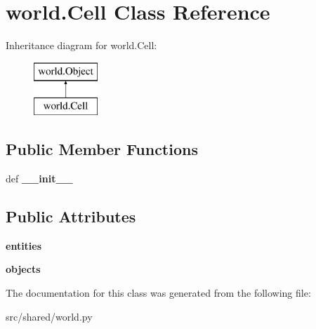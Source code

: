 \hypertarget{classworld_1_1_cell}{\section{world.\-Cell \-Class \-Reference}
\label{classworld_1_1_cell}
}
\-Inheritance diagram for world.\-Cell\-:\begin{figure}[H]
\begin{center}
\leavevmode
\includegraphics[height=2.000000cm]{classworld_1_1_cell}
\end{center}
\end{figure}
\subsection*{\-Public \-Member \-Functions}
\begin{DoxyCompactItemize}
\item 
\hypertarget{classworld_1_1_cell_a3dd387b6af13f7450acb97fb40c13a0e}{def {\bfseries \-\_\-\-\_\-init\-\_\-\-\_\-}}\label{classworld_1_1_cell_a3dd387b6af13f7450acb97fb40c13a0e}

\end{DoxyCompactItemize}
\subsection*{\-Public \-Attributes}
\begin{DoxyCompactItemize}
\item 
\hypertarget{classworld_1_1_cell_abacc61990c80c148f496f72be2f43dc6}{{\bfseries entities}}\label{classworld_1_1_cell_abacc61990c80c148f496f72be2f43dc6}

\item 
\hypertarget{classworld_1_1_cell_afd921144822811cc4c904bd1f0f3f746}{{\bfseries objects}}\label{classworld_1_1_cell_afd921144822811cc4c904bd1f0f3f746}

\end{DoxyCompactItemize}


\-The documentation for this class was generated from the following file\-:\begin{DoxyCompactItemize}
\item 
src/shared/world.\-py\end{DoxyCompactItemize}
